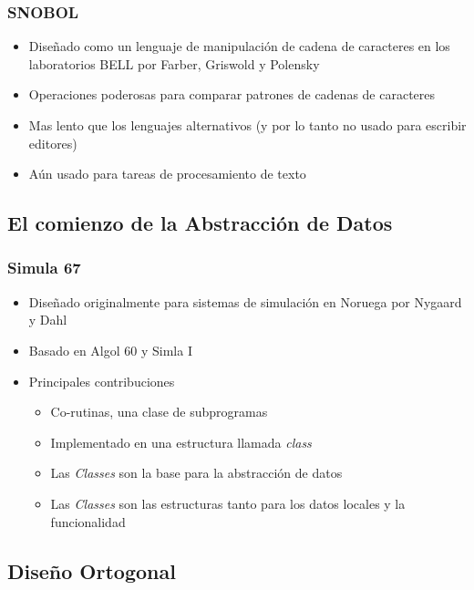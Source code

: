 \documentclass[11pt]{article}
\begin{document}
\subsubsection*{SNOBOL}
\label{sec:orgheadline78}
\begin{itemize}
\item Diseñado como un lenguaje de manipulación de cadena de caracteres en
los laboratorios BELL por Farber, Griswold y Polensky
\item Operaciones poderosas para comparar patrones de cadenas de caracteres
\item Mas lento que los lenguajes alternativos (y por lo tanto no usado
para escribir editores)
\item Aún usado para tareas de procesamiento de texto
\end{itemize}

\subsection*{El comienzo de la Abstracción de Datos}
\label{sec:orgheadline81}

\subsubsection*{Simula 67}
\label{sec:orgheadline80}
\begin{itemize}
\item Diseñado originalmente para sistemas de simulación en Noruega por
Nygaard y Dahl
\item Basado en Algol 60 y Simla I
\item Principales contribuciones
\begin{itemize}
\item Co-rutinas, una clase de subprogramas
\item Implementado en una estructura llamada \emph{class}
\item Las \emph{Classes} son la base para la abstracción de datos
\item Las \emph{Classes} son las estructuras tanto para los datos locales y
la funcionalidad
\end{itemize}
\end{itemize}

\subsection*{Diseño Ortogonal}
\label{sec:orgheadline88}
\end{document}
